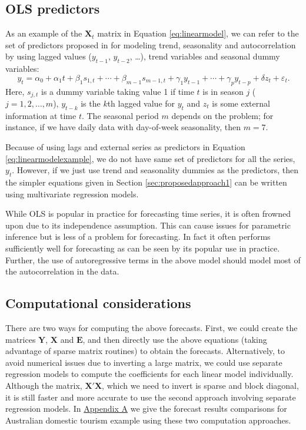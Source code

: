 \documentclass[11pt,a4paper,]{article}
\begin{document}
\hypertarget{ols-predictors}{%
\subsection{OLS predictors}\label{ols-predictors}}

As an example of the \(\bm{X}_t\) matrix in Equation
\eqref{eq:linearmodel}, we can refer to the set of predictors proposed in
\textcite{ashouri2018} for modeling trend, seasonality and
autocorrelation by using lagged values (\(y_{t-1}\), \(y_{t-2}\),
\dots), trend variables and seasonal dummy variables:
\begin{equation}\label{eq:linearmodelexample}
   y_t = \alpha_0 + \alpha_1 t + \beta_1 s_{1,t} + \cdots + \beta_{m-1} s_{m-1,t} + \gamma_1 y_{t-1} + \cdots + \gamma_p y_{t-p} + \delta z_t + \varepsilon_t.
\end{equation} Here, \(s_{j,t}\) is a dummy variable taking value 1 if
time \(t\) is in season \(j\) (\(j=1, 2, \dots, m\)), \(y_{t-k}\) is the
\(k\)th lagged value for \(y_t\) and \(z_t\) is some external
information at time \(t\). The seasonal period \(m\) depends on the
problem; for instance, if we have daily data with day-of-week
seasonality, then \(m=7\).

Because of using lags and external series as predictors in Equation
\eqref{eq:linearmodelexample}, we do not have same set of predictors for
all the series, \(y_t\). However, if we just use trend and seasonality
dummies as the predictors, then the simpler equations given in Section
\ref{sec:proposedapproach1} can be written using multivariate regression
models.

While OLS is popular in practice for forecasting time series, it is
often frowned upon due to its independence assumption. This can cause
issues for parametric inference but is less of a problem for
forecasting. In fact it often performs sufficiently well for forecasting
as can be seen by its popular use in practice. Further, the use of
autoregressive terms in the above model should model most of the
autocorrelation in the data.

\hypertarget{computational-considerations}{%
\subsection{Computational
considerations}\label{computational-considerations}}

There are two ways for computing the above forecasts. First, we could
create the matrices \(\bm{Y}\), \(\bm{X}\) and \(\bm{E}\), and then
directly use the above equations (taking advantage of sparse matrix
routines) to obtain the forecasts. Alternatively, to avoid numerical
issues due to inverting a large matrix, we could use separate regression
models to compute the coefficients for each linear model individually.
Although the matrix, \(\bm{X}'\bm{X}\), which we need to invert is
sparse and block diagonal, it is still faster and more accurate to use
the second approach involving separate regression models. In
\protect\hyperlink{appendixA}{Appendix A} we give the forecast results
comparisons for Australian domestic tourism example using these two
computation approaches.
\end{document}

